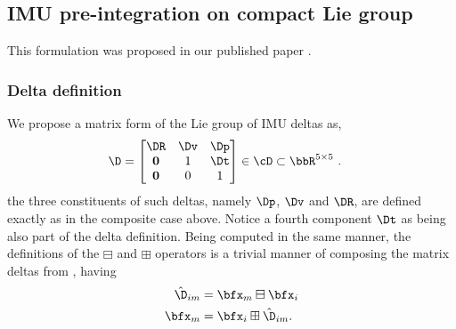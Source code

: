 \subsection{IMU pre-integration on compact Lie group}
\label{sec:imu_preint_compact}

This formulation was proposed in our published paper \cite{fourmy2019absolute}.

\subsubsection{Delta definition}

We propose a matrix form of the Lie group of IMU deltas as,
%
\begin{align}\label{equ:delta_Lie}
    \D &= 
    \begin{bmatrix}
    \DR & \Dv & \Dp \\
    \bf0 & 1 & \Dt \\
    \bf0 & 0 & 1
    \end{bmatrix} \in \cD \subset \bbR^{5\times 5}
    ~.
\end{align}
%
the three constituents of such deltas, namely $\Dp$, $\Dv$ and $\DR$, are defined exactly as in the composite case above. Notice a fourth component $\Dt$ as being also part of the delta definition.
Being computed in the same manner, the definitions of the $\boxminus$ and $\boxplus$ operators is a trivial manner of composing the matrix deltas from , having
%
\begin{align}
\hat\D_{im} &= \bfx_m \boxminus \bfx_i \\
\bfx_m &= \bfx_i \boxplus \hat\D_{im}.
\end{align}

